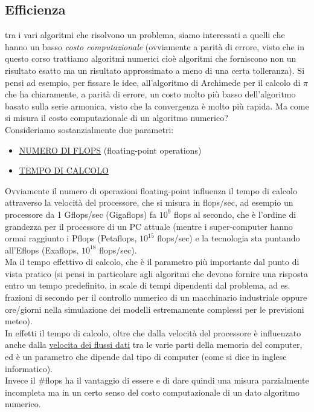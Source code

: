 \documentclass[12pt]{article}
\begin{document}
\subsection{Efficienza}
tra i vari algoritmi che risolvono un problema, siamo interessati a quelli che hanno un basso \textit{costo computazionale} (ovviamente a parità di errore, visto che in questo corso trattiamo algoritmi numerici cioè algoritmi che forniscono non un risultato esatto ma un risultato approssimato a meno di una certa tolleranza). Si pensi ad esempio, per fissare le idee, all'algoritmo di Archimede per il calcolo di $\pi$ che ha chiaramente, a parità di errore, un costo molto più basso dell'algoritmo basato sulla serie armonica, visto che la convergenza è molto più rapida.
\newline \newline
Ma come si misura il costo computazionale di un algoritmo numerico?\\ 
Consideriamo sostanzialmente due parametri:
\begin{itemize}
    \item \uline{NUMERO DI FLOPS} (floating-point operations)
    \item \uline{TEMPO DI CALCOLO} 
\end{itemize}
Ovviamente il numero di operazioni floating-point influenza il tempo di calcolo attraverso la velocità del processore, che si misura in flops/sec, ad esempio un processore da 1 Gflops/sec (Gigaflops) fa $10^9$ flops al secondo, che è l'ordine di grandezza per il processore di un PC attuale (mentre i super-computer hanno ormai raggiunto i Pflops (Petaflops, $10^{15}$ flops/sec) e la tecnologia sta puntando all'Eflops (Exaflops, $10^{18}$ flops/sec).\\ 
Ma il tempo effettivo di calcolo, che è il parametro più importante dal punto di vista pratico (si pensi in particolare agli algoritmi  che devono fornire una risposta entro un tempo predefinito, in scale di tempi dipendenti dal problema, ad es. frazioni di secondo per il controllo numerico di un macchinario industriale oppure ore/giorni nella simulazione dei modelli estremamente complessi per le previsioni meteo).\\ 
In effetti il tempo di calcolo, oltre che dalla velocità del processore è influenzato anche dalla \uline{velocita dei flussi dati} tra le varie parti della memoria del computer, ed è un parametro che dipende dal tipo di computer (come si dice in inglese informatico).\\
Invece il \#flops ha il vantaggio di essere  e di dare quindi una misura parzialmente incompleta ma in un certo senso  del costo computazionale di un dato algoritmo numerico. \\
\end{document}
